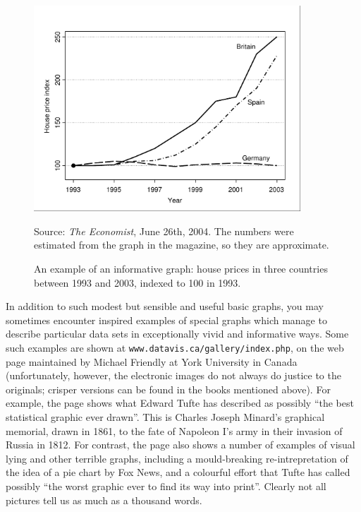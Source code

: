 \begin{figure}
\caption{An example of an informative graph: house prices in three
countries between 1993 and 2003, indexed to 100 in 1993.}
\label{f_houseprices}
\begin{center}
\includegraphics[width=10cm]{houseprices}
\end{center}

{\footnotesize Source: \emph{The Economist}, June 26th, 2004. The
numbers were estimated from the graph in the magazine, so they are
approximate.}
\end{figure}

In addition to such modest but sensible and useful basic graphs, you may
sometimes encounter inspired examples of
special graphs which manage to describe particular data sets in
exceptionally vivid and informative ways. Some such examples are shown
at \texttt{www.datavis.ca/gallery/index.php}, on the web page
maintained by Michael Friendly at York University in
Canada (unfortunately, however, the electronic images do not always
do justice to the originals; crisper versions can be found in the books
mentioned above). For example, the page shows what Edward Tufte has
described as possibly ``the best statistical graphic ever drawn''. This
is Charles Joseph Minard's graphical memorial, drawn in 1861, to the
fate of Napoleon I's army in their invasion of Russia in 1812.
For
contrast, the page also shows a number of examples of visual lying and
other terrible graphs, including a mould-breaking re-intrepretation of
the idea of a pie chart by Fox News, and
a colourful effort that Tufte has called possibly ``the
worst graphic ever to find its way into print''. Clearly not all
pictures tell us as much as a thousand words.



